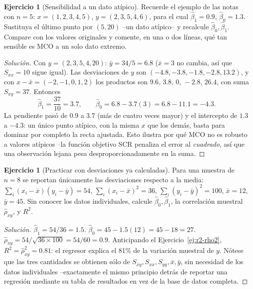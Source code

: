 \documentclass[11pt,a4paper,oneside]{article}
\theoremstyle{plain}
\theoremstyle{definition}
\newtheorem{exercise}[teorema]{Ejercicio}
\newcommand{\SCR}{\mathrm{SCR}}
\begin{document}
\begin{exercise}[Sensibilidad a un dato atípico]\label{ej:outlier}
Recuerde el ejemplo de las notas con $n=5$: $x=(1,2,3,4,5)$,
$y=(2,3,5,4,6)$, para el cual $\hat\beta_1=0.9$, $\hat\beta_0=1.3$.
Sustituya el último punto por $(5,20)$ --un dato atípico-- y recalcule
$\hat\beta_0,\hat\beta_1$. Compare con los valores originales y comente,
en una o dos líneas, qué tan sensible es MCO a un solo dato extremo.
\end{exercise}
\begin{proof}[Solución]
Con $y=(2,3,5,4,20)$: $\bar y=34/5=6.8$ ($\bar x=3$ no cambia, así que
$S_{xx}=10$ sigue igual). Las desviaciones de $y$ son
$(-4.8,-3.8,-1.8,-2.8,13.2)$, y con $x-\bar x=(-2,-1,0,1,2)$ los
productos son $9.6,\,3.8,\,0,\,-2.8,\,26.4$, con suma
$S_{xy}=37$. Entonces
\[
  \hat\beta_1 = \frac{37}{10}=3.7, \qquad
  \hat\beta_0 = 6.8-3.7(3) = 6.8-11.1=-4.3 .
\]
La pendiente pasó de $0.9$ a $3.7$ (más de cuatro veces mayor) y el
intercepto de $1.3$ a $-4.3$: un único punto atípico, con la misma $x$
que los demás, basta para dominar por completo la recta ajustada. Esto
ilustra por qué MCO no es robusto a valores atípicos --la función
objetivo $\SCR$ penaliza el error al \emph{cuadrado}, así que una
observación lejana pesa desproporcionadamente en la suma.
\end{proof}

\begin{exercise}[Practicar con desviaciones ya calculadas]\label{ej:numerico-desviaciones}
Para una muestra de $n=8$ se reportan únicamente las desviaciones
respecto a la media: $\sum_i(x_i-\bar x)(y_i-\bar y)=54$,
$\sum_i(x_i-\bar x)^2=36$, $\sum_i(y_i-\bar y)^2=100$, $\bar x=12$,
$\bar y=45$. Sin conocer los datos individuales, calcule
$\hat\beta_0,\hat\beta_1$, la correlación muestral $\hat\rho_{xy}$, y
$R^2$.
\end{exercise}
\begin{proof}[Solución]
$\hat\beta_1=54/36=1.5$. $\hat\beta_0=45-1.5(12)=45-18=27$.
$\hat\rho_{xy}=54/\sqrt{36\times100}=54/60=0.9$. Anticipando el
Ejercicio~\ref{ej:r2-rho2}, $R^2=\hat\rho_{xy}^2=0.81$: el regresor
explica el 81\% de la variación muestral de $y$. Nótese que las tres
cantidades se obtienen sólo de $S_{xy},S_{xx},S_{yy},\bar x,\bar y$, sin
necesidad de los datos individuales --exactamente el mismo principio
detrás de reportar una regresión mediante su tabla de resultados en vez
de la base de datos completa.
\end{proof}

\end{document}
